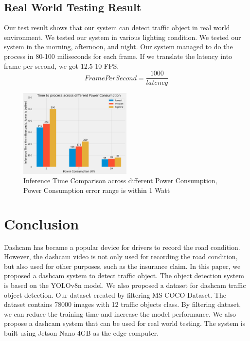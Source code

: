 \documentclass[conference]{IEEEtran}
\begin{document}
\subsection{Real World Testing Result}
Our test result shows that our system can detect traffic object in real world environment. We tested our system in various lighting condition. We tested our system in the morning, afternoon, and night. Our system managed to do the process in 80-100 miliseconds for each frame. If we translate the latency into frame per second, we got 12.5-10 FPS. 
\begin{equation}
    Frame Per Second = \frac{1000}{latency}
\end{equation}

\begin{figure}[h!]
\centering
\includegraphics[width=0.5\textwidth,keepaspectratio]{inference_time_comparison.png}
\caption{Inference Time Comparison across different Power Consumption, Power Consumption error range is within 1 Watt}
\label{fig:inference_time_comparison}
\end{figure}


\section{Conclusion}
Dashcam has became a popular device for drivers to record the road condition. However, the dashcam video is not only used for recording the road condition, but also used for other purposes, such as the insurance claim. 
In this paper, we proposed a dashcam system to detect traffic object. The object detection system is based on the YOLOv8n model. We also proposed a dataset for dashcam traffic object detection. Our dataset created by filtering MS COCO Dataset. The dataset contains 78000 images with 12 traffic objects class.
By filtering dataset, we can reduce the training time and increase the model performance.
We also propose a dashcam system that can be used for real world testing. The system is built using Jetson Nano 4GB as the edge computer.
\end{document}
